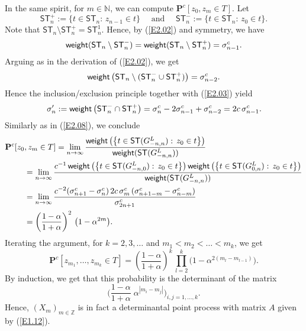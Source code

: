 \documentclass[11pt]{article}
\providecommand{\1}{\mathBB{1}}
\newcommand{\mbu}{\quad\mbox{ and }\quad}
\renewcommand{\P}{\mathbf{P}}
\newcommand{\N}{{\mathbb{N}}}
\newcommand{\Z}{{\mathbb{Z}}}
\newcommand{\equ}[1]{(\ref{#1})}
\def\SPT{\mathsf{ST}}
\newcommand{\weight}{\mathop{\mbox{\sf weight}}}
\begin{document}
In the same spirit, for $m\in \N$, we can compute $\P^c[z_0,z_m\in T]$. Let $$\SPT^+_n:=\{t\in\SPT_n:\,z_{n-1}\in t\}\mbu \SPT^-_n:=\{t\in\SPT_n:\,z_{0}\in t\}.$$
Note that $\SPT_n\setminus\SPT^+_n=\SPT^1_n$. Hence, by \equ{E2.02} and symmetry, we have
$$\weight(\SPT_n\setminus\SPT^-_n)=\weight(\SPT_n\setminus\SPT^+_n)=\sigma^c_{n-1}.$$
Arguing as in the derivation of \equ{E2.02}, we get
$$\weight\big(\SPT_n\setminus(\SPT^-_n\cup\SPT^+_n)\big)=\sigma^c_{n-2}.$$
Hence the inclusion/exclusion principle together with \equ{E2.03} yield
$$\sigma'_n:=\weight\big(\SPT^-_n\cap\SPT^+_n\big)=\sigma^c_n-2\sigma^c_{n-1}+\sigma^c_{n-2}=2c\,\sigma^c_{n-1}.$$
Similarly as in \equ{E2.08}, we conclude
\begin{equation}
\label{E2.09}
\begin{aligned}
\P^c[z_0&,z_m\in T]
=\lim_{n\to\infty}\frac{\weight\big(\big\{t\in\SPT(G^L_{-n,n}):\,z_0\in t\big\}\big)}{\weight(\SPT(G^L_{-n,n}))}\\
&=\lim_{n\to\infty}\frac{c^{-1}\weight\big(\big\{t\in\SPT(G^L_{-n,0}):\,z_0\in t\big\}\big)\weight\big(\big\{t\in\SPT(G^L_{0,n}):\,z_0\in t\big\}\big)}{\weight(\SPT(G^L_{-n,n}))}\\
&=\lim_{n\to\infty}\frac{c^{-2}(\sigma^c_{n+1}-\sigma^c_{n})\,2c\,\sigma^c_{m}\,(\sigma^c_{n+1-m}-\sigma^c_{n-m})}{\sigma^c_{2n+1}}\\
&=\left(\frac{1-\alpha}{1+\alpha}\right)^2\,\big(1-\alpha^{2m}\big).
\end{aligned}
\end{equation}
Iterating the argument, for $k=2,3,\ldots$ and $m_1<m_2<\ldots<m_k$, we get
\begin{equation}
\label{E2.10}
\P^c[z_{m_1},\ldots,z_{m_k}\in T]=\left(\frac{1-\alpha}{1+\alpha}\right)^k\,\prod_{l=2}^k\Big(1-\alpha^{2(m_l-m_{l-1})}\Big).
\end{equation}
By induction, we get that this probability is the determinant of the matrix $$\Big(\frac{1-\alpha}{1+\alpha}\;\alpha^{|m_{i}-m_{j}|}\Big)_{i,j=1,\ldots,k}.$$
Hence, $(X_m)_{m\in\Z}$ is in fact a determinantal point process with matrix $A$ given by
\equ{E1.12}.
\end{document}
